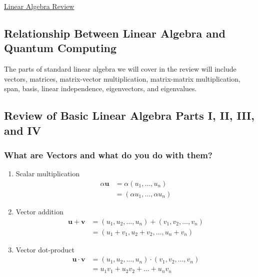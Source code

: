 \documentclass[main.tex]{subfiles}
\begin{document}
\href{https://www2.seas.gwu.edu/~simhaweb/quantum/modules/review/lin-review/lin-review.html}{Linear Algebra Review}

\subsection{Relationship Between Linear Algebra and Quantum Computing}

The parts of standard linear algebra we will cover in the review will include vectors, matrices, matrix-vector multiplication, matrix-matrix multiplication, span, basis, linear independence, eigenvectors, and eigenvalues.

\subsection{Review of Basic Linear Algebra Parts I, II, III, and IV}
    
    \subsubsection{What are Vectors and what do you do with them?}
    
    \begin{enumerate}[]
        \item Scalar multiplication $$\begin{aligned} \alpha \mathbf{u} &=\alpha\left(u_{1}, \ldots, u_{n}\right) \\ &=\left(\alpha u_{1}, \ldots, \alpha u_{n}\right) \end{aligned}$$
        
        \item Vector addition $$\begin{aligned} \mathbf{u}+\mathbf{v} &=\left(u_{1}, u_{2}, \ldots, u_{n}\right)+\left(v_{1}, v_{2}, \ldots, v_{n}\right) \\ &= \left(u_{1}+v_{1}, u_{2}+v_{2}, \ldots, u_{n}+v_{n}\right) \end{aligned}$$
        
        \item Vector dot-product $$\begin{aligned} \mathbf{u} \cdot \mathbf{v} &=\left(u_{1}, u_{2}, \ldots, u_{n}\right) \cdot\left(v_{1}, v_{2}, \ldots, v_{n}\right) \\ &=u_{1} v_{1}+u_{2} v_{2}+\ldots+u_{n} v_{n} \end{aligned}$$
    \end{enumerate}
    
\end{document}
